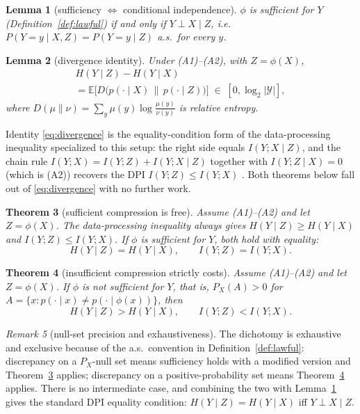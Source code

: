\documentclass[twocolumn,10pt]{article}
\newtheorem{theorem}{Theorem}[section]
\newtheorem{lemma}[theorem]{Lemma}
\theoremstyle{definition}
\theoremstyle{remark}
\newtheorem{remark}[theorem]{Remark}
\newcommand{\E}{\mathbb{E}}
\newcommand{\cY}{\mathcal{Y}}
\begin{document}
\begin{lemma}[sufficiency $\Leftrightarrow$ conditional independence]
\label{lem:ci}
$\phi$ is sufficient for $Y$ (Definition~\ref{def:lawful}) if and only if
$Y \perp X \mid Z$, i.e.\ $P(Y = y \mid X, Z) = P(Y = y \mid Z)$ a.s.\ for
every $y$.
\end{lemma}

\begin{lemma}[divergence identity]
\label{lem:divergence}
Under (A1)--(A2), with $Z = \phi(X)$,
\begin{multline}
\label{eq:divergence}
H(Y \mid Z) - H(Y \mid X) \\
= \E\Big[D\big(p(\cdot \mid X) \,\big\|\, p(\cdot \mid Z)\big)\Big]
\;\in\; [0, \log_2 |\cY|],
\end{multline}
where $D(\mu \| \nu) = \sum_y \mu(y) \log \frac{\mu(y)}{\nu(y)}$ is relative
entropy.
\end{lemma}

Identity \eqref{eq:divergence} is the equality-condition form of the
data-processing inequality specialized to this setup: the right side equals
$I(Y; X \mid Z)$, and the chain rule
$I(Y; X) = I(Y; Z) + I(Y; X \mid Z)$ together with $I(Y; Z \mid X) = 0$
(which is (A2)) recovers the DPI $I(Y; Z) \le I(Y; X)$
\cite[Thm.~2.8.1]{coverthomas}. Both theorems below fall out of
\eqref{eq:divergence} with no further work.

\begin{theorem}[sufficient compression is free]
\label{thm:lawful-preserve}
Assume (A1)--(A2) and let $Z = \phi(X)$. The data-processing inequality
always gives $H(Y \mid Z) \ge H(Y \mid X)$ and $I(Y; Z) \le I(Y; X)$. If
$\phi$ is sufficient for $Y$, both hold with equality:
\[
H(Y \mid Z) = H(Y \mid X), \qquad I(Y; Z) = I(Y; X).
\]
\end{theorem}

\begin{theorem}[insufficient compression strictly costs]
\label{thm:unlawful-cost}
Assume (A1)--(A2) and let $Z = \phi(X)$. If $\phi$ is not sufficient for
$Y$, that is, $P_X(A) > 0$ for
$A = \{x : p(\cdot \mid x) \neq p(\cdot \mid \phi(x))\}$, then
\[
H(Y \mid Z) > H(Y \mid X), \qquad I(Y; Z) < I(Y; X).
\]
\end{theorem}

\begin{remark}[null-set precision and exhaustiveness]
The dichotomy is exhaustive and exclusive because of the a.s.\ convention in
Definition~\ref{def:lawful}: discrepancy on a $P_X$-null set means
sufficiency holds with a modified version and
Theorem~\ref{thm:lawful-preserve} applies; discrepancy on a
positive-probability set means Theorem~\ref{thm:unlawful-cost} applies.
There is no intermediate case, and combining the two with
Lemma~\ref{lem:ci} gives the standard DPI equality condition:
$H(Y \mid Z) = H(Y \mid X)$ iff $Y \perp X \mid Z$.
\end{remark}
\end{document}
